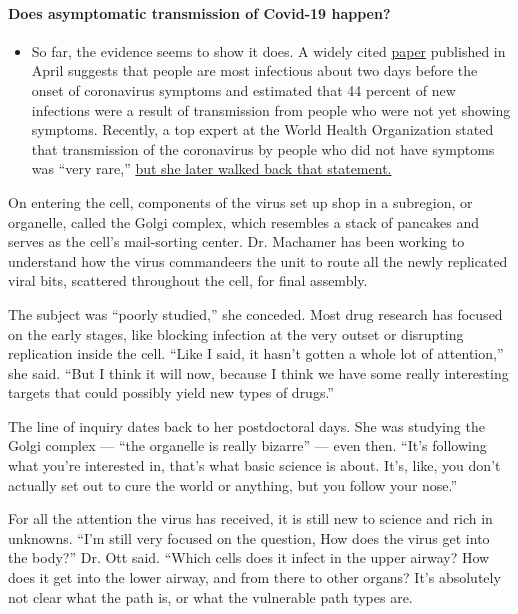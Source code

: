 \begin{itemize}
{  \paragraph{Does asymptomatic transmission of Covid-19
  happen?}\label{does-asymptomatic-transmission-of-covid-19-happen}}

  \begin{itemize}
  \tightlist
  \item
    So far, the evidence seems to show it does. A widely cited
    \href{https://www.nature.com/articles/s41591-020-0869-5}{paper}
    published in April suggests that people are most infectious about
    two days before the onset of coronavirus symptoms and estimated that
    44 percent of new infections were a result of transmission from
    people who were not yet showing symptoms. Recently, a top expert at
    the World Health Organization stated that transmission of the
    coronavirus by people who did not have symptoms was ``very rare,''
    \href{https://www.nytimes.com/2020/06/09/world/coronavirus-updates.html?action=click\&pgtype=Article\&state=default\&region=MAIN_CONTENT_3\&context=storylines_faq\#link-1f302e21}{but
    she later walked back that statement.}
  \end{itemize}
\end{itemize}

On entering the cell, components of the virus set up shop in a
subregion, or organelle, called the Golgi complex, which resembles a
stack of pancakes and serves as the cell's mail-sorting center. Dr.
Machamer has been working to understand how the virus commandeers the
unit to route all the newly replicated viral bits, scattered throughout
the cell, for final assembly.

The subject was ``poorly studied,'' she conceded. Most drug research has
focused on the early stages, like blocking infection at the very outset
or disrupting replication inside the cell. ``Like I said, it hasn't
gotten a whole lot of attention,'' she said. ``But I think it will now,
because I think we have some really interesting targets that could
possibly yield new types of drugs.''

The line of inquiry dates back to her postdoctoral days. She was
studying the Golgi complex --- ``the organelle is really bizarre'' ---
even then. ``It's following what you're interested in, that's what basic
science is about. It's, like, you don't actually set out to cure the
world or anything, but you follow your nose.''

For all the attention the virus has received, it is still new to science
and rich in unknowns. ``I'm still very focused on the question, How does
the virus get into the body?'' Dr. Ott said. ``Which cells does it
infect in the upper airway? How does it get into the lower airway, and
from there to other organs? It's absolutely not clear what the path is,
or what the vulnerable path types are.

